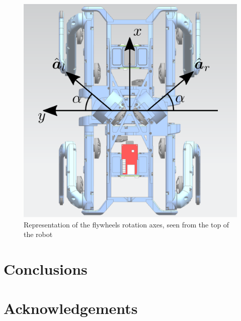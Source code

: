 \documentclass[journal,letterpaper]{IEEEtran}
\begin{document}
%
\begin{figure}
	\centering
	\includegraphics[width=0.7\linewidth]{figures/angular_velocities.eps}
	\caption{Representation of the flywheels rotation axes, seen from the top of the robot}
	\label{fig:angVel}
\end{figure}
\section{Conclusions}
\label{sec:conclusion}

\small
\section*{Acknowledgements}	



\printbibliography
\end{document}
